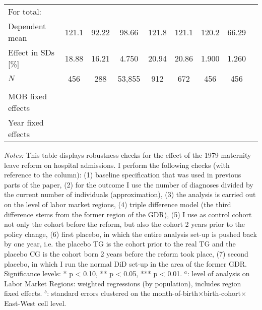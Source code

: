 \begin{landscape}
\begin{table}[htbp]
\begin{threeparttable}
{\begin{tabular}{l*{8}{c}}
					For total: 																																					\\							 
					Dependent mean 		&   121.1			&	92.22			&   98.66     		&	121.8			&  121.1			&	120.2			&	66.29		\\
					Effect in SDs [\%] 	&   18.88			&	16.21			&   4.750      		&	20.94			&  20.86			&	1.900			&	1.260		\\
					$N$ 				&   456				&	288				&   53,855    		&	912				&  672				&	456 			&	456			\\
					\\
					MOB fixed effects 	&   \checkmark		&	\checkmark		&   \checkmark		& \checkmark		& \checkmark		&	\checkmark		&  \checkmark	\\ 
					Year fixed effects  &   \checkmark		&	\checkmark		&   \checkmark		& \checkmark		& \checkmark		&	\checkmark		&  \checkmark	\\ 
					\bottomrule
			\end{tabular}}
		\end{threeparttable} 
		\begin{minipage}{0.66\linewidth}
			\scriptsize \emph{Notes:} This table displays robustness checks for the effect of the 1979 maternity leave reform on hospital admissions. I perform the following checks (with reference to the column): (1) baseline specification that was used in previous parts of the paper, (2) for the outcome I use the number of diagnoses divided by the current number of individuals (approximation), (3) the analysis is carried out on the level of labor market regions, (4) triple difference model (the third difference stems from the former region of the GDR), (5) I use as control cohort not only the cohort before the reform, but also the cohort 2 years prior to the policy change, (6) first placebo, in which the entire analysis set-up is pushed back by one year, i.e. the placebo TG is the cohort prior to the real TG and the placebo CG is the cohort born 2 years before the reform took place, (7) second placebo, in which I run the normal DiD set-up in the area of the former GDR. \newline Significance levels: * p < 0.10, ** p < 0.05, *** p < 0.01. \newline
			\hspace*{15 pt}$^a$: level of analysis on Labor Market Regions: weighted regressions (by population), includes region fixed effects.\newline
			\hspace*{15 pt}$^b$: standard errors clustered on the month-of-birth$\times$birth-cohort$\times$East-West cell level.
		\end{minipage}
	\end{table} 
	\vspace*{\fill}\clearpage
\end{landscape}






